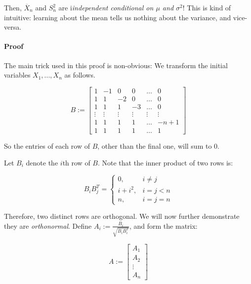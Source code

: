 \documentclass[a4paper]{article}
\begin{document}
                Then, $\overline X_n$ and $S_n^2$ are i\textit{independent
                conditional on $\mu$ and $\sigma^2$}! This is kind of intuitive:
                learning about the mean tells us nothing about the variance, and
                vice-versa.

                \paragraph{Proof}
                    The main trick used in this proof is non-obvious: We
                    transform the initial variables $X_1, ..., X_n$ as follows.

                    \[
                        B := \begin{bmatrix}1 & -1 & 0 & 0 & \dots & 0 \\
                            1 & 1 & -2 & 0 & \dots & 0 \\
                            1 & 1 & 1 & -3 & \dots & 0 \\
                            \vdots & \vdots & \vdots & \vdots & \vdots &
                                \vdots \\
                            1 & 1 & 1 & 1 & \dots & -n + 1 \\
                            1 & 1 & 1 & 1 & \dots & 1
                        \end{bmatrix}
                    \]

                    So the entries of each row of $B$, other than the final one,
                    will sum to $0$.

                    Let $B_i$ denote the $i$th row of $B$. Note that the inner
                    product of two rows is:

                    \[
                        B_iB_j^T = \begin{cases}
                            0, & i \neq j \\
                            i + i^2, & i = j < n \\
                            n, & i = j = n
                        \end{cases}
                    \]

                    Therefore, two distinct rows are orthogonal. We will now
                    further demonstrate they are \textit{orthonormal}. Define
                    $A_i := \frac{B_i}{\sqrt{B_iB_i^T}}$, and form the matrix:

                    \[
                        A := \begin{bmatrix}A_1 \\ A_2 \\ \vdots \\ A_n
                        \end{bmatrix}
                    \]
\end{document}
